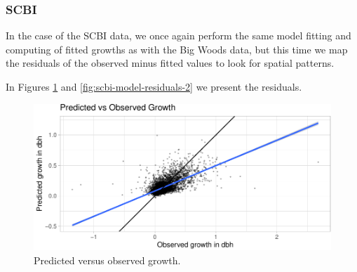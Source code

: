 \documentclass[12pt]{article}
\newenvironment{Shaded}{\begin{snugshade}}{\end{snugshade}}
\newcommand{\CommentTok}[1]{\textcolor[rgb]{0.56,0.35,0.01}{\textit{#1}}}
\newcommand{\DataTypeTok}[1]{\textcolor[rgb]{0.13,0.29,0.53}{#1}}
\newcommand{\KeywordTok}[1]{\textcolor[rgb]{0.13,0.29,0.53}{\textbf{#1}}}
\newcommand{\NormalTok}[1]{#1}
\newcommand{\OperatorTok}[1]{\textcolor[rgb]{0.81,0.36,0.00}{\textbf{#1}}}
\newcommand{\OtherTok}[1]{\textcolor[rgb]{0.56,0.35,0.01}{#1}}
\newcommand{\StringTok}[1]{\textcolor[rgb]{0.31,0.60,0.02}{#1}}
\begin{document}
\hypertarget{scbi-3}{%
\subsubsection{SCBI}\label{scbi-3}}

In the case of the SCBI data, we once again perform the same model
fitting and computing of fitted growths as with the Big Woods data, but
this time we map the residuals of the observed minus fitted values to
look for spatial patterns.

\begin{Shaded}
\end{Shaded}

\begin{Shaded}
\end{Shaded}

\begin{Shaded}
\end{Shaded}

In Figures \ref{fig:scbi-model-residuals} and
\ref{fig:scbi-model-residuals-2} we present the residuals.

\begin{figure}

{\centering \includegraphics[width=1\linewidth]{Figures/scbi-model-residuals-1} 

}

\caption{Predicted versus observed growth.}\label{fig:scbi-model-residuals}
\end{figure}
\end{document}
